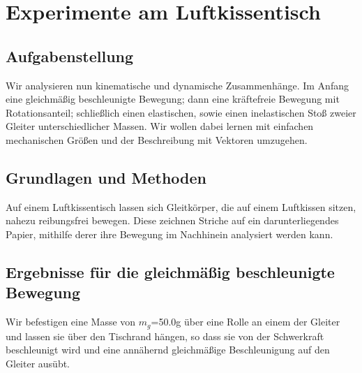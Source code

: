 \documentclass{article}
\begin{document}
\section{Experimente am Luftkissentisch}

\subsection{Aufgabenstellung}
Wir analysieren nun kinematische und dynamische Zusammenhänge. 
Im Anfang eine gleichmäßig beschleunigte Bewegung; dann eine kräftefreie Bewegung mit Rotationsanteil; schließlich einen elastischen, sowie einen inelastischen Stoß zweier Gleiter unterschiedlicher Massen. Wir wollen dabei lernen mit einfachen mechanischen Größen und der Beschreibung mit Vektoren umzugehen. 

\subsection{Grundlagen und Methoden}

Auf einem Luftkissentisch lassen sich Gleitkörper, die auf einem Luftkissen sitzen, nahezu reibungsfrei bewegen. Diese zeichnen Striche auf ein darunterliegendes Papier, mithilfe derer ihre Bewegung im Nachhinein analysiert werden kann. 



\subsection{Ergebnisse für die gleichmäßig beschleunigte Bewegung}
 Wir befestigen eine Masse von $m_g$=50.0g über eine Rolle an einem der Gleiter und lassen sie über den Tischrand hängen, so dass sie von der Schwerkraft beschleunigt wird und eine annähernd gleichmäßige Beschleunigung auf den Gleiter ausübt.
\end{document}
